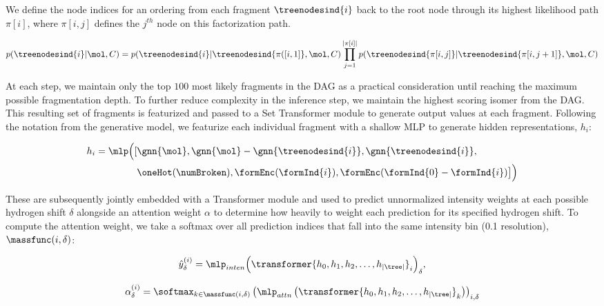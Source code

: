 \documentclass[journal=jcim,manuscript=article]{achemso}
\begin{document}
We define the node indices for an ordering from each fragment $\treenodesind{i}$ back to the root node through its highest likelihood path $\pi[i]$, where $\pi[i,j]$ defines the $j^{th}$ node on this factorization path.

\begin{equation}
p(\treenodesind{i} | \mol, C) =  p(\treenodesind{i} |  \treenodesind{\pi([i,1]}, \mol, C) \prod_{j =1}^{ |\pi[i]|} p(\treenodesind{\pi[i,j]} | \treenodesind{\pi[i, j+1]}, \mol, C) 
\end{equation}

At each step, we maintain only the top $100$ most likely fragments in the DAG as a practical consideration until reaching the maximum possible fragmentation depth. To further reduce complexity in the inference step, we maintain the highest scoring isomer from the DAG. This resulting set of fragments is featurized and passed to a Set Transformer module to generate output values at each fragment. Following the notation from the generative model, we featurize each individual fragment with a shallow MLP to generate hidden representations, $h_i$:

\begin{equation}
\begin{split}
h_i = \mlp \Big([&\gnn{\mol},\gnn{\mol} - \gnn{\treenodesind{i}}, \gnn{\treenodesind{i}}, \\
&\oneHot(\numBroken),\formEnc(\formInd{i}) ,\formEnc(\formInd{0} - \formInd{i})\big]\Big)
\end{split}
\end{equation}

These are subsequently jointly embedded with a Transformer module and used to predict unnormalized intensity weights at each possible hydrogen shift $\delta$ alongside an attention weight $\alpha$ to determine how heavily to weight each prediction for its specified hydrogen shift. To compute the attention weight, we take a softmax over all prediction indices that fall into the same intensity bin (0.1 resolution), $\massfunc(i, \delta)$:


\begin{equation}
\hat{y}^{(i)}_{\delta} = \mlp_{inten}  \Big(\transformer{h_0, h_1,h_2,\dots,h_{|\tree|}}_i\Big)_\delta,
\end{equation}

\begin{equation}
\alpha^{(i)}_{\delta} = \softmax_{k \in \massfunc(i, \delta)} \left(\mlp_{attn} \left( \transformer{h_0, h_1,h_2,\dots,h_{|\tree|}}_k\right)\right)_{i, \delta}
\end{equation}
\end{document}
